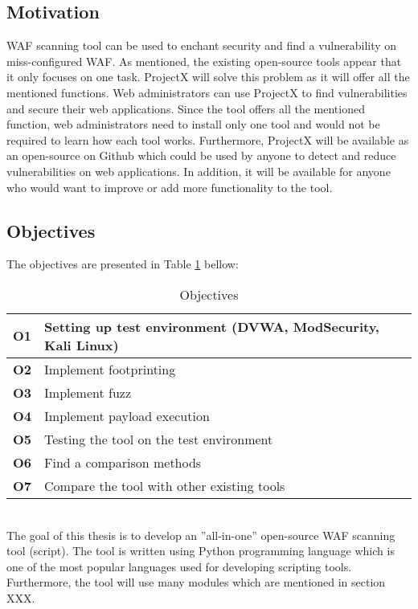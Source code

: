 \documentclass[a4paper,12pt]{article}
\begin{document}
\subsection{Motivation}
WAF scanning tool can be used to enchant security and find a vulnerability on miss-configured WAF. As mentioned, the existing open-source tools appear that it only focuses on one task. ProjectX will solve this problem as it will offer all the mentioned functions. Web administrators can use ProjectX to find vulnerabilities and secure their web applications. Since the tool offers all the mentioned function, web administrators need to install only one tool and would not be required to learn how each tool works. Furthermore, ProjectX will be available as an open-source on Github which could be used by anyone to detect and reduce vulnerabilities on web applications. In addition, it will be available for anyone who would want to improve or add more functionality to the tool.

\subsection{Objectives}
The objectives are presented in Table \ref{ob} bellow: 
\begin{table}[ht]
    \centering
    \begin{tabular} {|p{1.2cm}|p{11.6cm}|} \hline
    \textbf{O1} & Setting up test environment (DVWA, ModSecurity, Kali Linux)  \\ \hline
    \textbf{O2} & Implement footprinting \\ \hline
    \textbf{O3} & Implement fuzz \\ \hline
    \textbf{O4} & Implement payload execution\\ \hline
    \textbf{O5} & Testing the tool on the test environment \\ \hline
    \textbf{O6} & Find a comparison methods \\ \hline
    \textbf{O7} & Compare the tool with other existing tools \\ \hline
    \end{tabular}
    \caption{Objectives}
    \label{ob}
\end{table} 

\\
The goal of this thesis is to develop an ”all-in-one” open-source WAF scanning tool (script). The tool is written using Python programming language which is one of the most popular languages used for developing scripting tools. Furthermore, the tool will use many modules which are mentioned in section XXX. 
\end{document}
